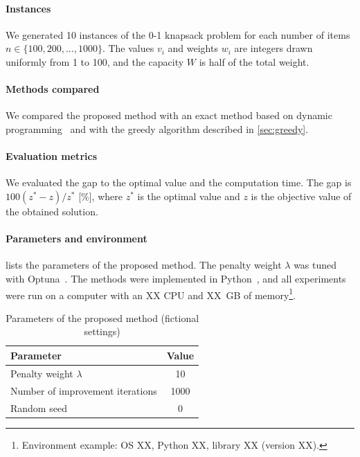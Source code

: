 \paragraph{Instances}
We generated 10 instances of the 0-1 knapsack problem for each number of items $n \in \{100, 200, \dots, 1000\}$.
The values $v_i$ and weights $w_i$ are integers drawn uniformly from 1 to 100,
and the capacity $W$ is half of the total weight.

\paragraph{Methods compared}
We compared the proposed method with an exact method based on dynamic programming~\cite{kellerer2004knapsack}
and with the greedy algorithm described in \cref{sec:greedy}.

\paragraph{Evaluation metrics}
We evaluated the gap to the optimal value and the computation time.
The gap is $100 (z^{*} - z) / z^{*}$ [\%], where $z^{*}$ is the optimal value
and $z$ is the objective value of the obtained solution.

\paragraph{Parameters and environment}
 lists the parameters of the proposed method.
The penalty weight $\lambda$ was tuned with Optuna~\cite{akiba2019optuna}.
The methods were implemented in Python~\cite{python},
and all experiments were run on a computer with an XX CPU and XX~GB of memory\footnote{%
  Environment example: OS XX, Python XX, library XX (version XX).}.

\begin{table}[htbp]
  \centering
  \caption{Parameters of the proposed method (fictional settings)}
  \label{tab:parameters}
  \begin{tabular}{lc}
    \toprule
    Parameter & Value \\
    \midrule
    Penalty weight $\lambda$ & 10 \\
    Number of improvement iterations & 1000 \\
    Random seed & 0 \\
    \bottomrule
  \end{tabular}
\end{table}

